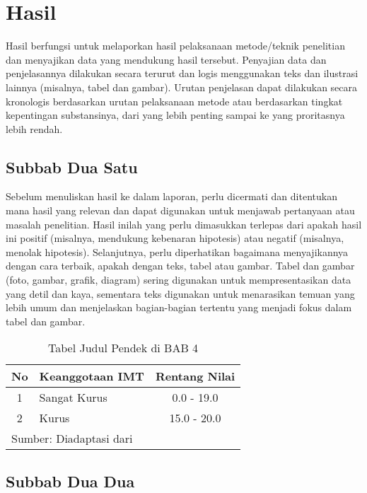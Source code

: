 
\newpage
\chapter{Hasil}
 
Hasil berfungsi untuk melaporkan hasil pelaksanaan metode/teknik penelitian dan menyajikan data yang mendukung hasil tersebut. Penyajian data dan penjelasannya dilakukan secara terurut dan logis menggunakan teks dan ilustrasi lainnya (misalnya, tabel dan gambar). Urutan penjelasan dapat dilakukan secara kronologis berdasarkan urutan pelaksanaan metode atau berdasarkan tingkat kepentingan substansinya, dari yang lebih penting sampai ke yang proritasnya lebih rendah. 

\section{Subbab Dua Satu}

Sebelum menuliskan hasil ke dalam laporan, perlu dicermati dan ditentukan mana hasil yang relevan dan dapat digunakan untuk menjawab pertanyaan atau masalah penelitian.  Hasil inilah yang perlu dimasukkan terlepas dari apakah hasil ini positif (misalnya, mendukung kebenaran hipotesis) atau negatif (misalnya, menolak hipotesis). Selanjutnya, perlu diperhatikan bagaimana menyajikannya dengan cara terbaik, apakah dengan teks, tabel atau gambar. Tabel dan gambar (foto, gambar, grafik, diagram) sering digunakan untuk mempresentasikan data yang detil dan kaya, sementara teks digunakan untuk menarasikan temuan yang lebih umum dan menjelaskan bagian-bagian tertentu yang menjadi fokus dalam tabel dan gambar. 

\begin{table}[htbp]
  \centering
  \renewcommand{\arraystretch}{1.2}
  \caption{Tabel Judul Pendek di BAB 4}
  \begin{tabular}{clc}
    \hline
    No & Keanggotaan IMT & Rentang Nilai \\
    \hline
    1 & Sangat Kurus & 0.0 - 19.0 \\
    2 & Kurus & 15.0 - 20.0 \\
    \hline
    \multicolumn{3}{l}{\footnotesize{Sumber: Diadaptasi dari \cite{anggariawan:2014}}} \\
  \end{tabular}
  \label{tab:dibab4}
\end{table}


\section{Subbab Dua Dua}


